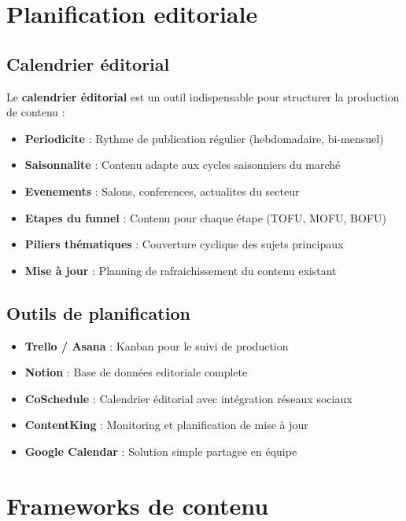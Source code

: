 \documentclass[12pt,a4paper,twoside]{report}
\newcommand{\keyword}[1]{\textbf{\textcolor{googleblue}{#1}}}
\begin{document}
\section{Planification editoriale}

\subsection{Calendrier éditorial}

Le \keyword{calendrier éditorial} est un outil indispensable pour structurer la production de contenu :

\begin{itemize}
    \item \textbf{Periodicite} : Rythme de publication régulier (hebdomadaire, bi-mensuel)
    \item \textbf{Saisonnalite} : Contenu adapte aux cycles saisonniers du marché
    \item \textbf{Evenements} : Salons, conferences, actualites du secteur
    \item \textbf{Etapes du funnel} : Contenu pour chaque étape (TOFU, MOFU, BOFU)
    \item \textbf{Piliers thématiques} : Couverture cyclique des sujets principaux
    \item \textbf{Mise à jour} : Planning de rafraichissement du contenu existant
\end{itemize}

\subsection{Outils de planification}

\begin{itemize}
    \item \textbf{Trello / Asana} : Kanban pour le suivi de production
    \item \textbf{Notion} : Base de données editoriale complete
    \item \textbf{CoSchedule} : Calendrier éditorial avec intégration réseaux sociaux
    \item \textbf{ContentKing} : Monitoring et planification de mise à jour
    \item \textbf{Google Calendar} : Solution simple partagee en équipe
\end{itemize}

\section{Frameworks de contenu}
\end{document}
